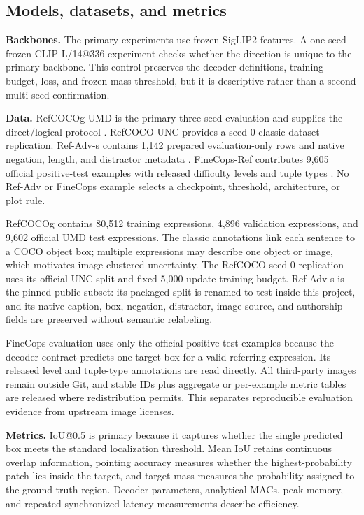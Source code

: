 \documentclass[10pt]{article}
\begin{document}
\subsection{Models, datasets, and metrics}\label{models-datasets-and-metrics}

\textbf{Backbones.} The primary experiments use frozen SigLIP2 features. A
one-seed frozen CLIP-L/14@336 experiment checks whether the direction is unique
to the primary backbone. This control preserves the decoder definitions,
training budget, loss, and frozen mass threshold, but it is descriptive rather
than a second multi-seed confirmation.

\textbf{Data.} RefCOCOg UMD is the primary three-seed evaluation and supplies
the direct/logical protocol \citep{yu2016context}. RefCOCO UNC provides a
seed-0 classic-dataset replication. Ref-Adv-s contains 1,142 prepared
evaluation-only rows and native negation, length, and distractor metadata
\citep{dong2026refadv}. FineCops-Ref contributes 9,605 official positive-test
examples with released difficulty levels and tuple types
\citep{liu2024finecops}. No Ref-Adv or FineCops example selects a checkpoint,
threshold, architecture, or plot rule.

RefCOCOg contains 80,512 training expressions, 4,896 validation expressions,
and 9,602 official UMD test expressions. The classic annotations link each
sentence to a COCO object box; multiple expressions may describe one object or
image, which motivates image-clustered uncertainty. The RefCOCO seed-0
replication uses its official UNC split and fixed 5,000-update training budget.
Ref-Adv-s is the pinned public subset: its packaged split is renamed to test
inside this project, and its native caption, box, negation, distractor, image
source, and authorship fields are preserved without semantic relabeling.

FineCops evaluation uses only the official positive test examples because the
decoder contract predicts one target box for a valid referring expression. Its
released level and tuple-type annotations are read directly. All third-party
images remain outside Git, and stable IDs plus aggregate or per-example metric
tables are released where redistribution permits. This separates reproducible
evaluation evidence from upstream image licenses.

\textbf{Metrics.} IoU@0.5 is primary because it captures whether the single
predicted box meets the standard localization threshold. Mean IoU retains
continuous overlap information, pointing accuracy measures whether the
highest-probability patch lies inside the target, and target mass measures the
probability assigned to the ground-truth region. Decoder parameters, analytical
MACs, peak memory, and repeated synchronized latency measurements describe
efficiency.
\end{document}
